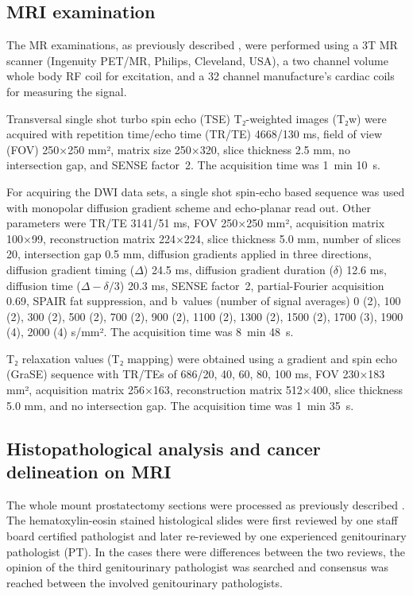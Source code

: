 \documentclass[10pt,letterpaper]{article}
\newcommand{\citep}{\cite}
\begin{document}
\subsection{MRI examination}

The MR examinations, as previously described \citep{Jambor2015Evaluation,
Toivonen2015, Jambor2015Relaxation}, were performed using a 3T MR scanner
(Ingenuity PET/MR, Philips, Cleveland, USA), a two channel volume whole body RF
coil for excitation, and a 32 channel manufacture's cardiac coils for measuring
the signal.

Transversal single shot turbo spin echo (TSE) T₂-weighted images (T₂w) were
acquired with repetition time/echo time (TR/TE) 4668/130 ms, field of view (FOV)
250×250 mm², matrix size 250×320, slice thickness 2.5 mm, no intersection gap,
and SENSE \citep{Pruessmann1999} factor~2. The acquisition time was 1~min 10~s.

For acquiring the DWI data sets, a single shot spin-echo based sequence was used
with monopolar diffusion gradient scheme and echo-planar read out. Other
parameters were TR/TE 3141/51 ms, FOV 250×250 mm², acquisition matrix 100×99,
reconstruction matrix 224×224, slice thickness 5.0 mm, number of slices 20,
intersection gap 0.5 mm, diffusion gradients applied in three directions,
diffusion gradient timing ($\Delta$) 24.5 ms, diffusion gradient duration
($\delta$) 12.6 ms, diffusion time ($\Delta-\delta/3$) 20.3 ms, SENSE
\citep{Pruessmann1999} factor~2, partial-Fourier acquisition 0.69, SPAIR fat
suppression, and b~values (number of signal averages) 0 (2), 100 (2), 300 (2),
500 (2), 700 (2), 900 (2), 1100 (2), 1300 (2), 1500 (2), 1700 (3), 1900 (4),
2000 (4) s/mm². The acquisition time was 8~min 48~s.

T₂ relaxation values (T₂ mapping) were obtained using a gradient and spin echo
(GraSE) sequence with TR/TEs of 686/20, 40, 60, 80, 100 ms, FOV 230×183 mm²,
acquisition matrix 256×163, reconstruction matrix 512×400, slice thickness 5.0
mm, and no intersection gap. The acquisition time was 1~min 35~s.


\subsection{Histopathological analysis and cancer delineation on MRI}

The whole mount prostatectomy sections were processed as previously described
\citep{Jambor2015Evaluation, Jambor2015Rotating}. The hematoxylin-eosin stained
histological slides were first reviewed by one staff board certified pathologist
and later re-reviewed by one experienced genitourinary pathologist (PT). In the
cases there were differences between the two reviews, the opinion of the third
genitourinary pathologist was searched and consensus was reached between the
involved genitourinary pathologists.
\end{document}
